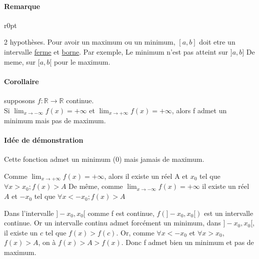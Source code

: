 \paragraph{Remarque}

\begin{wrapfigure}[5]{r}{0pt}
\end{wrapfigure}
2 hypothèses. Pour avoir un maximum ou un minimum, $[a, b]$ doit etre un intervalle \ul{ferme} et \ul{borne}. Par exemple, Le minimum n'est pas atteint sur $]a, b]$ De meme, sur $[a, b[$ pour le maximum.

		\paragraph{Corollaire} supposons $f : \mathbb{R} \rightarrow \mathbb{R}$ continue. ~\\
		Si $\lim_{x \to -\infty} f(x) = +\infty$ et $\lim_{x \to +\infty} f(x) = +\infty$, alors f admet un minimum mais pas de maximum.

\paragraph{Idée de démonstration}

Cette fonction admet un minimum (0) mais jamais de maximum.

Comme $\lim_{x \to +\infty} f(x) = +\infty$, alors il existe un réel A et $x_0$ tel que $\forall x > x_0; f(x) > A$ De même, comme $\lim_{x \to -\infty} f(x) = + \infty$ il existe un réel $A$ et $-x_0$ tel que $\forall x < -x_0; f(x) > A$

Dans l'intervalle $]-x_0, x_0[$ comme f est continue, $f(]-x_0, x_0[)$ est un intervalle continue. Or un intervalle continu admet forcément un minimum, dans $]-x_0, x_0[$, il existe un $c$ tel que $f(x) > f(c)$. Or, comme $\forall x < -x_0$ et $\forall x > x_0$, $f(x) > A$, on à $f(x) > A > f(x)$. Donc f admet bien un minimum et pas de maximum. 

